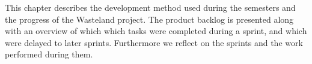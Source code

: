 This chapter describes the development method used during the semesters and the progress of the Wasteland project. The product backlog is presented along with an overview of which which tasks were completed during a sprint, and which were delayed to later sprints. Furthermore we reflect on the sprints and the work performed during them.